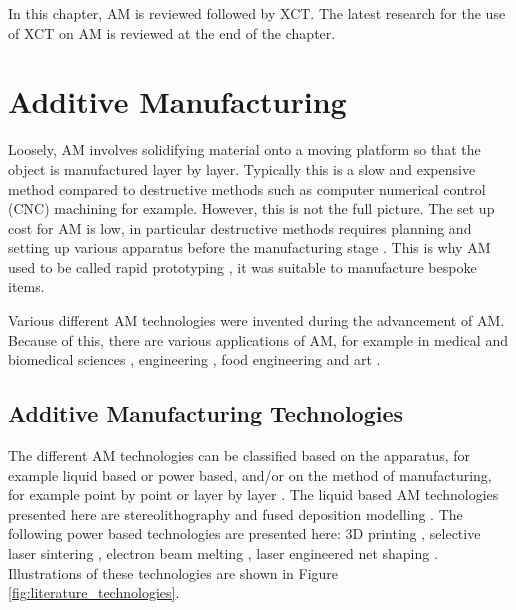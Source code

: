 In this chapter, AM is reviewed followed by XCT. The latest research for the use of XCT on AM is reviewed at the end of the chapter.

\section{Additive Manufacturing}

Loosely, AM involves solidifying material onto a moving platform so that the object is manufactured layer by layer. Typically this is a slow and expensive method compared to destructive methods such as computer numerical control (CNC) machining for example. However, this is not the full picture. The set up cost for AM is low, in particular destructive methods requires planning and setting up various apparatus before the manufacturing stage \citep{gibson2010additive}. This is why AM used to be called rapid prototyping \citep{kruth1991material}, it was suitable to manufacture bespoke items.

Various different AM technologies were invented during the advancement of AM. Because of this, there are various applications of AM, for example in medical and biomedical sciences \citep{kang20163d, kourra2018computed}, engineering \citep{cooper2015design}, food engineering \citep{godoi20163d} and art \citep{ornes2013mathematics, grossman2019bathsheba}.

\subsection{Additive Manufacturing Technologies}

The different AM technologies can be classified based on the apparatus, for example liquid based or power based, and/or on the method of manufacturing, for example point by point or layer by layer \citep{kruth1991material}. The liquid based AM technologies presented here are stereolithography \citep{kodama1981automatic, hull1986apparatus, 3d2019our} and fused deposition modelling \citep{crump1991fused, crump1992apparatus, stratasys2019what}. The following power based technologies are presented here: 3D printing \citep{sachs1990three}, selective laser sintering \citep{deckard1989method, dtm1990the, 3d2019our}, electron beam melting \citep{larsson2004arrangement, arcam2019history}, laser engineered net shaping \citep{atwood1998laser}. Illustrations of these technologies are shown in Figure \ref{fig:literature_technologies}.

